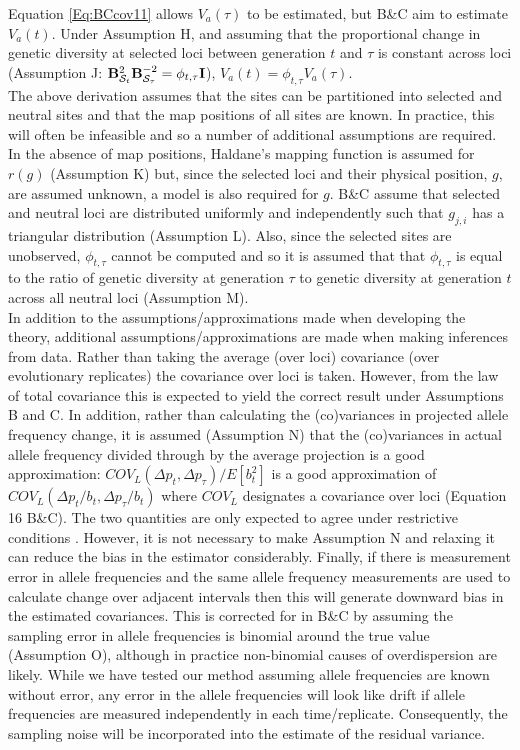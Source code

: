 \documentclass[12pt]{article}
\begin{document}
\begin{bibunit}
Equation \ref{Eq:BCcov11} allows $V_a(\tau)$ to be estimated, but B\&C aim to estimate $V_a(t)$.  Under Assumption H, and assuming that the proportional change in genetic diversity at selected loci between generation $t$ and $\tau$ is constant across loci (Assumption J: ${\bf B}_{\mathcal{S}_t}^2{\bf B}_{\mathcal{S}_\tau}^{-2} = \phi_{t,\tau}{\bf I}$), $V_a(t)=\phi_{t,\tau} V_a(\tau)$.\\ 

The above derivation assumes that the sites can be partitioned into selected and neutral sites and that the map positions of all sites are known.  In practice, this will often be infeasible and so a number of additional assumptions are required. In the absence of map positions, Haldane's \citeyearpar{haldane1919map} mapping function is assumed for $r(g)$ (Assumption K) but, since the selected loci and their physical position, $g$, are assumed unknown, a model is also required for $g$. B\&C assume that selected and neutral loci are distributed uniformly and independently such that $g_{j,i}$ has a triangular distribution (Assumption L). Also, since the selected sites are unobserved, $\phi_{t,\tau}$ cannot be computed and so it is assumed that that $\phi_{t,\tau}$ is equal to the ratio of genetic diversity at generation $\tau$ to genetic diversity at generation $t$ across all neutral loci (Assumption M). \\ 
 
In addition to the assumptions/approximations made when developing the theory, additional assumptions/approximations are made when making inferences from data.  Rather than taking the average (over loci) covariance (over evolutionary replicates) the covariance over loci is taken. However, from the law of total covariance this is expected to yield the correct result under Assumptions B and C. In addition, rather than calculating the (co)variances in projected allele frequency change, it is assumed (Assumption N) that the (co)variances in actual allele frequency divided through by the average projection is a good approximation: $COV_{L}(\Delta p_{t}, \Delta p_{\tau})/E[b_t^2]$ is a good approximation of $COV_{L}(\Delta p_{t}/b_{t}, \Delta p_{\tau}/b_{t})$ where $ COV_L$ designates a covariance over loci (Equation 16 B\&C). The two quantities are only expected to agree under restrictive conditions \citep{Bohrnstedt.1969}. However, it is not necessary to make Assumption N and relaxing it can reduce the bias in the estimator considerably. Finally, if there is measurement error in allele frequencies and the same allele frequency measurements are used to calculate change over adjacent intervals then this will generate downward bias in the estimated covariances. This is corrected for in B\&C by assuming the sampling error in allele frequencies is binomial around the true value (Assumption O), although in practice non-binomial causes of overdispersion are likely. While we have tested our method assuming allele frequencies are known without error, any error in the allele frequencies will look like drift if allele frequencies are measured independently in each time/replicate. Consequently, the sampling noise will be incorporated into the estimate of the residual variance. \\ 


\end{bibunit}
\end{document}
